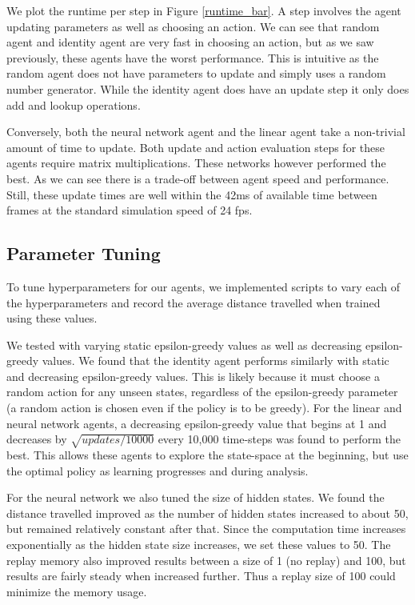 \documentclass[12pt]{article}
\begin{document}
We plot the runtime per step in Figure \ref{runtime_bar}. A step involves the agent updating parameters as well as choosing an action. We can see that random agent and identity agent are very fast in choosing an action, but as we saw previously, these agents have the worst performance. This is intuitive as the random agent does not have parameters to update and simply uses a random number generator. While the identity agent does have an update step it only does add and lookup operations.

Conversely, both the neural network agent and the linear agent take a non-trivial amount of time to update. Both update and action evaluation steps for these agents require matrix multiplications. These networks however performed the best. As we can see there is a trade-off between agent speed and performance. Still, these update times are well within the 42ms of available time between frames at the standard simulation speed of 24 fps.

\subsection{Parameter Tuning}

To tune hyperparameters for our agents, we implemented scripts to vary each of the hyperparameters and record the average distance travelled when trained using these values. 

We tested with varying static epsilon-greedy values as well as decreasing epsilon-greedy values. We found that the identity agent performs similarly with static and decreasing epsilon-greedy values. This is likely because it must choose a random action for any unseen states, regardless of the epsilon-greedy parameter (a random action is chosen even if the policy is to be greedy). For the linear and neural network agents, a decreasing epsilon-greedy value that begins at 1 and decreases by $\sqrt{updates / 10000}$ every 10,000 time-steps was found to perform the best. This allows these agents to explore the state-space at the beginning, but use the optimal policy as learning progresses and during analysis.

For the neural network we also tuned the size of hidden states. We found the distance travelled improved as the number of hidden states increased to about 50, but remained relatively constant after that. Since the computation time increases exponentially as the hidden state size increases, we set these values to 50. The replay memory also improved results between a size of 1 (no replay) and 100, but results are fairly steady when increased further. Thus a replay size of 100 could minimize the memory usage.
\end{document}
